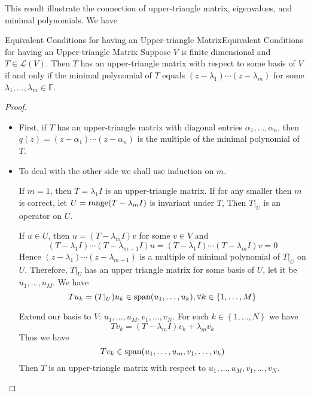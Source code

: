 \documentclass[../main.tex]{subfiles}
\begin{document}
This result illustrate the connection of upper-triangle matrix, eigenvalues, and minimal polynomials. We have
\begin{theorem}{Equivalent Conditions for having an Upper-triangle Matrix}{Equivalent Conditions for having an Upper-triangle Matrix}
Suppose $V$ is finite dimensional and $T\in \mathscr{L}(V)$. Then $T$ has an upper-triangle matrix with respect to some basis of $V$ if and only if the minimal polynomial of $T$ equals $(z-\lambda_1)\cdots (z-\lambda_m)$ for some $\lambda_1, \ldots ,\lambda_m\in \mathbb{F}$.
\end{theorem}
\begin{proof}
\begin{itemize}
\item First, if $T$ has an upper-triangle matrix with diagonal entries $\alpha_1, \ldots ,\alpha_n$, then $q(z) = (z-\alpha_1)\cdots (z-\alpha_n)$ is the multiple of the minimal polynomial of $T$.
\item To deal with the other side we shall use induction on $m$.

If $m=1$, then $T=\lambda_1I$ is an upper-triangle matrix. If for any smaller then $m$ is correct, let $U = \operatorname{range} (T-\lambda_mI)$ is invariant under $T$, Then $T|_U$ is an operator on $U$.

If $u\in U$, then $u=(T-\lambda_mI)v$ for some $v\in V$ and
\begin{equation*}
	(T-\lambda_1I)\cdots (T-\lambda_{m-1}I)u = (T-\lambda_1I)\cdots (T-\lambda_mI)v = 0
\end{equation*}
Hence $(z-\lambda_1)\cdots (z-\lambda_{m-1})$ is a multiple of minimal polynomial of $T|_U$ on $U$. Therefore, $T|_U$ has an upper triangle matrix for some basis of $U$, let it be $u_1, \ldots ,u_M$. We have
\begin{equation*}
Tu_k = (T|_U)u_k \in \operatorname{span} (u_1, \ldots ,u_k), \forall k\in \left\{ 1, \ldots ,M \right\}
\end{equation*}

Extend our basis to $V$: $u_1, \ldots ,u_M, v_1, \ldots ,v_N$. For each $k\in \left\{ 1, \ldots ,N \right\}$ we have
\begin{equation*}
Tv_k = (T-\lambda_mI)v_k + \lambda_mv_k
\end{equation*}
Thus we have
\begin{equation*}
Tv_k \in \operatorname{span} (u_1, \ldots ,u_m,v_1, \ldots ,v_k)
\end{equation*}
Then $T$ is an upper-triangle matrix with respect to $u_1, \ldots ,u_M,v_1, \ldots ,v_N$.
\end{itemize}
\end{proof}
\end{document}

